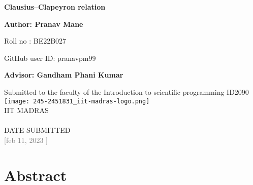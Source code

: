 \documentclass[12pt]{report}
\renewcommand{\>}{\ensuremath >\xspace}
\newcommand{\<}{\ensuremath <\xspace}
\begin{document}
\thispagestyle{empty}

\begin{titlepage}
    \begin{center}
        \vspace*{0pt}
        \makeatletter    
        \Huge
        \textbf{\@ Clausius–Clapeyron relation}\\
        \vspace{1ex}
        \Large
        
         
        \vspace{5ex}
        \textbf{Author: Pranav Mane}

        \vspace{0ex}
        Roll no : BE22B027
        
        GitHub user ID: pranavpm99
        \vspace{5ex}
    
        \textbf{Advisor: Gandham Phani Kumar}
        \vfill
       
        \large{Submitted to the faculty of the Introduction to scientific programming ID2090}\\
        \vspace{3ex}
               \texttt{[image: 245-2451831\_iit-madras-logo.png]}\\    
    
        \vspace{2ex}
        \large
        \textsc{IIT MADRAS}\\
        \textsc{}\\
        \vspace{.5ex}
        \normalsize DATE SUBMITTED\\
        \footnotesize \textcolor{gray}{[feb 11, 2023 ]}
        \makeatother
    \end{center}
\end{titlepage}



\clearpage
{}
\chapter*{Abstract}
\addtocounter{page}{-1}
\end{document}
